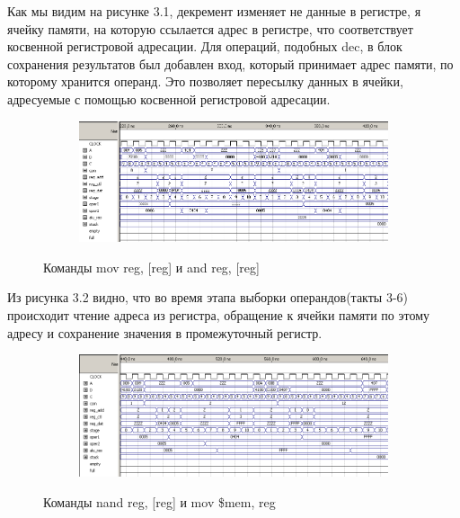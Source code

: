 Как мы видим на рисунке 3.1, декремент изменяет не данные в регистре, я ячейку памяти, на которую ссылается адрес в регистре, что соответствует косвенной регистровой адресации.
Для операций, подобных dec, в блок сохранения результатов был добавлен вход, который принимает адрес памяти, по которому хранится операнд. Это позволяет пересылку данных в ячейки, адресуемые с помощью косвенной регистровой адресации.

\begin{figure}[ht]
\centering
  \begin{subfigure}[b]{\textwidth}
    \centering
    \includegraphics[scale=0.68]{pc_wave2_part2}
    \caption{}
  \end{subfigure}
    \caption{Команды mov reg, [reg] и and reg, [reg]}
\end{figure}

Из рисунка 3.2 видно, что во время этапа выборки операндов(такты 3-6) происходит чтение адреса из регистра, обращение к ячейки памяти по этому адресу и сохранение значения в промежуточный регистр.

\begin{figure}[ht]
\centering
  \begin{subfigure}[b]{\textwidth}
    \centering
    \includegraphics[scale=0.68]{pc_wave2_part3}
    \caption{}
  \end{subfigure}
    \caption{Команды nand reg, [reg] и mov \$mem, reg}
\end{figure}

